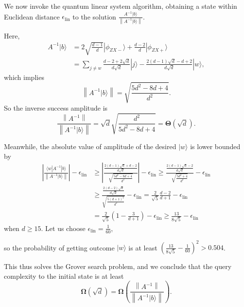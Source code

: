 \documentclass[letterpaper,onecolumn,11pt,accepted=2026-02-14]{quantumarticle}
\newcommand{\abs}[1]{\left\lvert#1\right\rvert}
\newcommand{\norm}[1]{\left\lVert#1\right\rVert}
\theoremstyle{remark}
\theoremstyle{plain}
\newcommand{\ket}[1]{|#1\rangle}
\newcommand{\bra}[1]{\langle#1|}
\begin{document}
We now invoke the quantum linear system algorithm, obtaining a state within Euclidean distance $\epsilon_{\text{lin}}$ to the solution $\frac{A^{-1}\ket{b}}{\norm{A^{-1}\ket{b}}}$.
\addtocounter{equation}{1}%
Here,
\begin{equation}
\begin{aligned}
    A^{-1}\ket{b}
    &=2\sqrt{\frac{d-1}{d}}\ket{\phi_{ZX-}}+\frac{d-2}{d}\ket{\phi_{ZX+}}\\
    &=\sum_{j\neq w}\frac{d-2+2\sqrt{d}}{d\sqrt{d}}\ket{j}
    -\frac{2(d-1)\sqrt{d}-d+2}{d\sqrt{d}}\ket{w},
\end{aligned}
\end{equation}
which implies
\begin{equation}
    \norm{A^{-1}\ket{b}}
    =\sqrt{\frac{5d^2-8d+4}{d^2}}.
\end{equation}
So the inverse success amplitude is
\begin{equation}
    \frac{\norm{A^{-1}}}{\norm{A^{-1}\ket{b}}}
    =\sqrt{d}\sqrt{\frac{d^2}{5d^2-8d+4}}
    =\mathbf{\Theta}\left(\sqrt{d}\right).
\end{equation}

Meanwhile, the absolute value of amplitude of the desired $\ket{w}$ is lower bounded by
\begin{equation}
\begin{aligned}
    \abs{\frac{\bra{w}A^{-1}\ket{b}}{\norm{A^{-1}\ket{b}}}}-\epsilon_{\text{lin}}
    &\geq\abs{\frac{\frac{2(d-1)\sqrt{d}+d-2}{d\sqrt{d}}}{\sqrt{\frac{5d^2-8d+4}{d^2}}}}-\epsilon_{\text{lin}}
    \geq\frac{\frac{2(d-1)\sqrt{d}-2}{d\sqrt{d}}}{\sqrt{\frac{5d^2+4}{d^2}}}-\epsilon_{\text{lin}}\\
    &\geq\frac{\frac{2(d-2)\sqrt{d}}{d\sqrt{d}}}{\sqrt{\frac{5(d+1)^2}{d^2}}}-\epsilon_{\text{lin}}
    =\frac{2}{\sqrt{5}}\frac{d-2}{d+1}-\epsilon_{\text{lin}}\\
    &=\frac{2}{\sqrt{5}}\left(1-\frac{3}{d+1}\right)-\epsilon_{\text{lin}}
    \geq\frac{13}{8\sqrt{5}}-\epsilon_{\text{lin}}
\end{aligned}
\end{equation}
when $d\geq 15$. Let us choose $\epsilon_{\text{lin}}=\frac{1}{60}$,
\addtocounter{equation}{1}%
so the probability of getting outcome $\ket{w}$ is at least $\left(\frac{13}{8\sqrt{5}}-\frac{1}{60}\right)^2
    >0.504$.
\addtocounter{equation}{1}%
This thus solves the Grover search problem, and we conclude that the query complexity to the initial state is at least
\begin{equation}
    \mathbf{\Omega}\left(\sqrt{d}\right)
    =\mathbf{\Omega}\left(\frac{\norm{A^{-1}}}{\norm{A^{-1}\ket{b}}}\right).
\end{equation}
\end{document}

